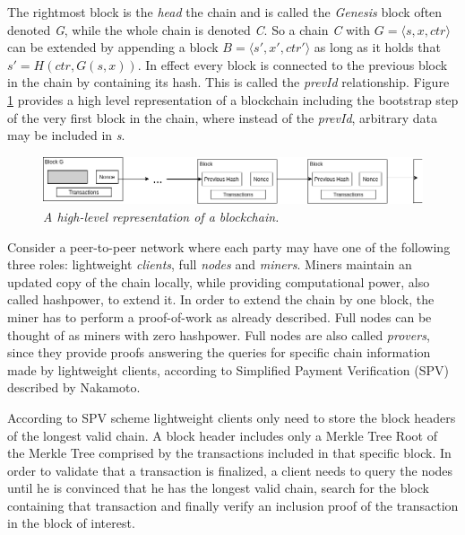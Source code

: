 \documentclass[10pt,a4paper]{article}
\begin{document}
The rightmost block is the \textit{head} the chain and is called the \textit{Genesis} block often
denoted \textit{G}, while the whole chain is denoted \textit{C}. So a chain \textit{C} with
$G = \langle s, x, ctr \rangle$ can be extended by appending a block $B = \langle s', x', ctr'
\rangle$ as long as it holds that $s' = H(ctr, G(s,x))$. In effect every block is connected to the
previous block in the chain by containing its hash. This is called the \textit{prevId} relationship.
Figure \ref{fig:abstract_chain} provides a high level representation of a blockchain including the
bootstrap step of the very first block in the chain, where instead of the \textit{prevId},
arbitrary data may be included in \textit{s}.

\begin{figure}[h!]
	\begin{center}
		\includegraphics[scale=0.49]{figures/abstract_chain_bootstrap.png}
	\end{center}
	\caption{\textit{A high-level representation of a blockchain. }}
	\label{fig:abstract_chain}
\end{figure}


Consider a peer-to-peer network where each party may have one of the following three roles:
lightweight \textit{clients}, full \textit{nodes} and \textit{miners}.
Miners maintain an updated copy of the chain locally, while providing computational power, also
called hashpower, to extend it. In order to extend the chain by one block, the miner has to perform
a proof-of-work as already described.
Full nodes can be thought of as miners with zero hashpower. Full nodes are also called
\textit{provers}, since they provide proofs  answering the queries for specific chain information
made by lightweight clients, according to Simplified Payment Verification (SPV) described by
Nakamoto\cite{Nakamoto}.

According to SPV scheme lightweight clients only need to store the block headers of the longest
valid chain. A block header includes only a Merkle Tree Root of the Merkle Tree comprised by
the transactions included in that specific block. In order to validate that a transaction is
finalized, a client needs to query the nodes until he is convinced that he has the longest
valid chain, search for the block containing that transaction and finally verify an inclusion
proof of the transaction in the block of interest.
\end{document}
